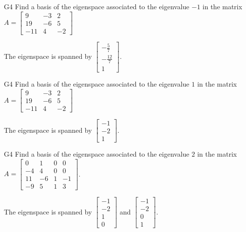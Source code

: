 \begin{problem}{G4}
Find a basis of the eigenspace associated to the eigenvalue $-1$ in the matrix $A=\begin{bmatrix}9 & -3 & 2 \\ 19 & -6 & 5 \\ -11 & 4 & -2 \end{bmatrix}$
\end{problem}
\begin{solution}
The eigenspace is spanned by $\begin{bmatrix} -\frac{5}{7} \\ - \frac{12}{7} \\ 1 \end{bmatrix}$.
\end{solution}

\begin{problem}{G4}
Find a basis of the eigenspace associated to the eigenvalue $1$ in the matrix $A=\begin{bmatrix}9 & -3 & 2 \\ 19 & -6 & 5 \\ -11 & 4 & -2 \end{bmatrix}$
\end{problem}
\begin{solution}
The eigenspace is spanned by $\begin{bmatrix} -1 \\ -2 \\ 1 \end{bmatrix}$.
\end{solution}

\begin{problem}{G4}
Find a basis of the eigenspace associated to the eigenvalue $2$ in the matrix $A=\begin{bmatrix} 0 & 1 & 0 & 0 \\ -4 & 4 & 0 & 0 \\ 11 & -6 & 1 & -1 \\ -9 & 5 & 1 & 3 \end{bmatrix}$.
\end{problem}
\begin{solution}
The eigenspace is spanned by $\begin{bmatrix} -1 \\ -2 \\ 1 \\ 0 \end{bmatrix}$ and $\begin{bmatrix} -1 \\ -2 \\ 0 \\ 1 \end{bmatrix}$.
\end{solution}

